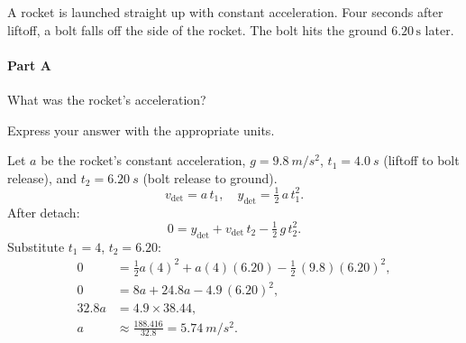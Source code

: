 A rocket is launched straight up with constant acceleration. Four seconds after liftoff, a bolt falls off the side of the rocket. The bolt hits the ground \(6.20\,\mathrm{s}\) later.

\paragraph{Part A}
What was the rocket's acceleration?

Express your answer with the appropriate units.

\begin{solution}
Let \(a\) be the rocket's constant acceleration, \(g=\SI{9.8}{m/s^2}\), \(t_1=\SI{4.0}{s}\) (liftoff to bolt release), and \(t_2=\SI{6.20}{s}\) (bolt release to ground).
\[
    v_{\mathrm{det}} = a\,t_1,\quad y_{\mathrm{det}} = \tfrac12\,a\,t_1^2.
\]
After detach:
\[
    0 = y_{\mathrm{det}} + v_{\mathrm{det}}\,t_2 - \tfrac12\,g\,t_2^2.
\]
Substitute \(t_1=4\), \(t_2=6.20\):
\begin{align*}
    0 &= \tfrac12 a(4)^2 + a(4)(6.20) - \tfrac12\,(9.8)(6.20)^2,\\
    0 &= 8a + 24.8a - 4.9\,(6.20)^2,\\
    32.8a &= 4.9\times38.44,\\
    a &\approx \frac{188.416}{32.8} = \SI{5.74}{m/s^2}.
\end{align*}
\end{solution}

